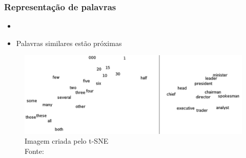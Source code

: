 \documentclass[10pt]{beamer}
\begin{document}
\begin{frame}[fragile]
  \frametitle{Representação de palavras}

   \begin{itemize}
    \item[\ ] \
    \item Palavras similares estão próximas
     
  \end{itemize}

  \begin{figure}[htb]
    \begin{center}
        \includegraphics[scale=0.18]{img/Turian-WordTSNE}
    \end{center}
    \caption{Imagem criada pelo t-SNE\\Fonte: }

  \end{figure}
\end{frame}
\end{document}
